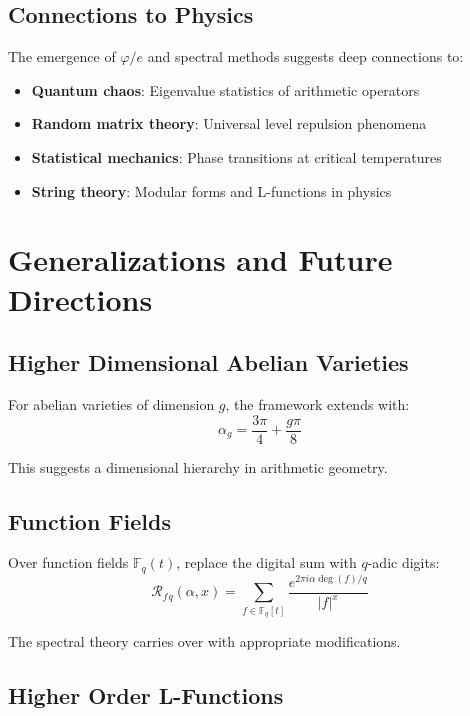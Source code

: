 \documentclass[12pt]{article}
\newcommand{\F}{\mathbb{F}}
\newcommand{\fractalres}{\mathcal{R}_f}
\newcommand{\goldenratio}{\varphi}
\begin{document}
\subsection{Connections to Physics}

The emergence of $\goldenratio/e$ and spectral methods suggests deep connections to:
\begin{itemize}
\item \textbf{Quantum chaos}: Eigenvalue statistics of arithmetic operators
\item \textbf{Random matrix theory}: Universal level repulsion phenomena
\item \textbf{Statistical mechanics}: Phase transitions at critical temperatures
\item \textbf{String theory}: Modular forms and L-functions in physics
\end{itemize}

\section{Generalizations and Future Directions}

\subsection{Higher Dimensional Abelian Varieties}

For abelian varieties of dimension $g$, the framework extends with:
\begin{equation}
\alpha_g = \frac{3\pi}{4} + \frac{g\pi}{8}
\end{equation}

This suggests a dimensional hierarchy in arithmetic geometry.

\subsection{Function Fields}

Over function fields $\F_q(t)$, replace the digital sum with $q$-adic digits:
\begin{equation}
\fractalres{_q}(\alpha, x) = \sum_{f \in \F_q[t]} \frac{e^{2\pi i \alpha \deg(f)/q}}{|f|^x}
\end{equation}

The spectral theory carries over with appropriate modifications.

\subsection{Higher Order L-Functions}
\end{document}
